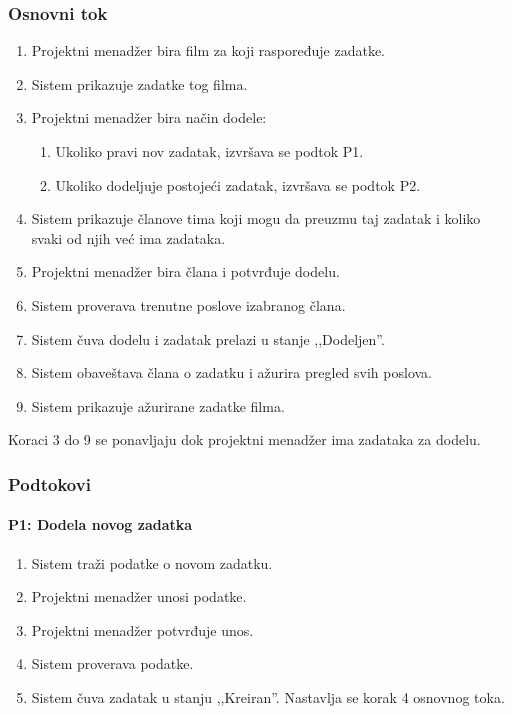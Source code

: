 \subsubsection*{Osnovni tok}
\begin{enumerate}
    \item Projektni menadžer bira film za koji raspoređuje zadatke.
    \item Sistem prikazuje zadatke tog filma.
    \item Projektni menadžer bira način dodele:
    \begin{enumerate}
        \item Ukoliko pravi nov zadatak, izvršava se podtok P1.
        \item Ukoliko dodeljuje postojeći zadatak, izvršava se podtok P2.
    \end{enumerate}
    \item Sistem prikazuje članove tima koji mogu da preuzmu taj zadatak i koliko svaki od njih već ima zadataka.
    \item Projektni menadžer bira člana i potvrđuje dodelu.
    \item Sistem proverava trenutne poslove izabranog člana.
    \item Sistem čuva dodelu i zadatak prelazi u stanje ,,Dodeljen''.
    \item Sistem obaveštava člana o zadatku i ažurira pregled svih poslova.
    \item Sistem prikazuje ažurirane zadatke filma.
\end{enumerate}

Koraci 3 do 9 se ponavljaju dok projektni menadžer ima zadataka za dodelu.

\subsubsection*{Podtokovi}

\paragraph*{P1: Dodela novog zadatka}
\begin{enumerate}
    \item Sistem traži podatke o novom zadatku.
    \item Projektni menadžer unosi podatke.
    \item Projektni menadžer potvrđuje unos.
    \item Sistem proverava podatke.
    \item Sistem čuva zadatak u stanju ,,Kreiran''. Nastavlja se korak 4 osnovnog toka.
\end{enumerate}

